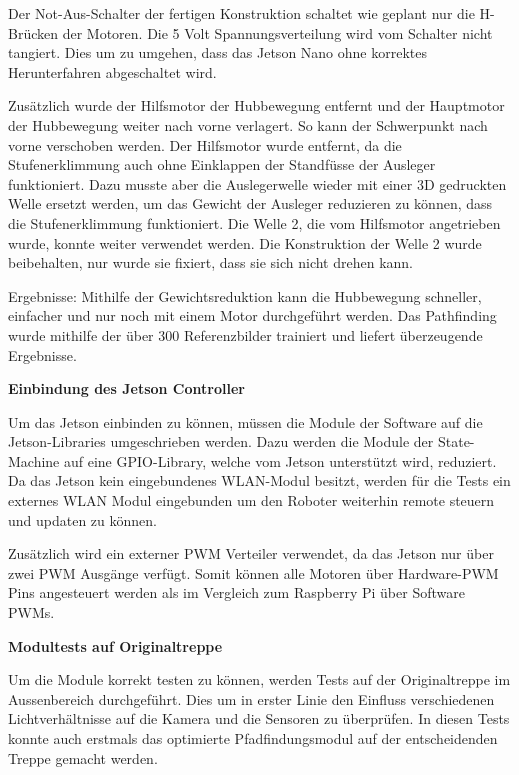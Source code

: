 Der Not-Aus-Schalter der fertigen Konstruktion schaltet wie geplant nur die H-Brücken der Motoren. Die 5 Volt Spannungsverteilung wird vom Schalter nicht tangiert. Dies um zu umgehen, dass das Jetson Nano ohne korrektes Herunterfahren abgeschaltet wird.
  
Zusätzlich wurde der Hilfsmotor der Hubbewegung entfernt und der Hauptmotor der Hubbewegung weiter nach vorne verlagert. So kann der Schwerpunkt nach vorne verschoben werden. Der Hilfsmotor wurde entfernt, da die Stufenerklimmung auch ohne Einklappen der Standfüsse der Ausleger funktioniert. Dazu musste aber die Auslegerwelle wieder mit einer 3D gedruckten Welle ersetzt werden, um das Gewicht der Ausleger reduzieren zu können, dass die Stufenerklimmung funktioniert. Die Welle 2, die vom Hilfsmotor angetrieben wurde, konnte weiter verwendet werden. Die Konstruktion der Welle 2 wurde beibehalten, nur wurde sie fixiert, dass sie sich nicht drehen kann.
  
Ergebnisse: Mithilfe der Gewichtsreduktion kann die Hubbewegung schneller, einfacher und nur noch mit einem Motor durchgeführt werden. Das Pathfinding wurde mithilfe der über 300 Referenzbilder trainiert und liefert überzeugende Ergebnisse.
 
\textbf{Einbindung des Jetson Controller}

Um das Jetson einbinden zu können, müssen die Module der Software auf die Jetson-Libraries umgeschrieben werden. Dazu werden die Module der State-Machine auf eine GPIO-Library, welche vom Jetson unterstützt wird, reduziert. Da das Jetson kein eingebundenes WLAN-Modul besitzt, werden für die Tests ein externes WLAN Modul eingebunden um den Roboter weiterhin remote steuern und updaten zu können.
 
Zusätzlich wird ein externer PWM Verteiler verwendet, da das Jetson nur über zwei PWM Ausgänge verfügt. Somit können alle Motoren über Hardware-PWM Pins angesteuert werden als im Vergleich zum Raspberry Pi über Software PWMs. 
 
\newpage
 
\textbf{Modultests auf Originaltreppe}

Um die Module korrekt testen zu können, werden Tests auf der Originaltreppe im Aussenbereich durchgeführt. Dies um in erster Linie den Einfluss verschiedenen Lichtverhältnisse auf die Kamera und die Sensoren zu überprüfen. In diesen Tests konnte auch erstmals das optimierte Pfadfindungsmodul auf der entscheidenden Treppe gemacht werden.

